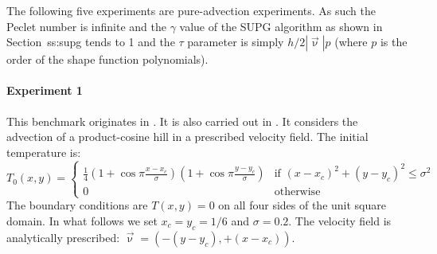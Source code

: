 The following five experiments are pure-advection experiments. As such the Peclet number
is infinite and the $\gamma$ value of the SUPG algorithm as shown in Section~{ss:supg} tends to 1
and the $\tau$ parameter is simply $h/2 |\vec\upnu| p$ (where $p$ is the order of the shape function polynomials).



\paragraph{Experiment 1}

This benchmark originates in \cite{dohu03}. It is also carried out in \cite{bepo10}.
It considers the advection of a product-cosine hill
in a prescribed velocity field. The initial temperature is:
\begin{equation}
T_0(x,y)=
\left\{
\begin{array}{cc}
\frac{1}{4}
\left(1+\cos \pi\frac{x-x_c}{\sigma}\right)
\left(1+\cos \pi\frac{y-y_c}{\sigma}\right)
& \text{if } (x-x_c)^2+(y-y_c)^2\leq \sigma^2 \\
0 & \text{otherwise}
\end{array}
\right.
\end{equation}
The boundary conditions are $T(x,y)=0$ on all four sides of the unit square domain. In what follows we set $x_c=y_c=1/6$ and $\sigma=0.2$.  The velocity field is analytically prescribed: $\vec\upnu=(-(y-y_c),+(x-x_c))$.

